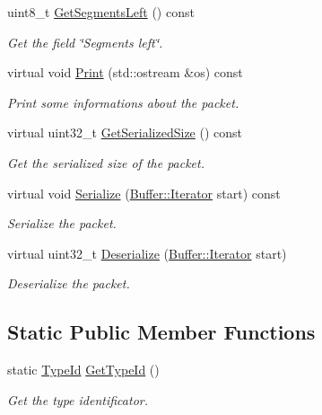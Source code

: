 \begin{DoxyCompactItemize}
uint8\+\_\+t \hyperlink{classns3_1_1Ipv6ExtensionRoutingHeader_a8eb73ece29725d2122833899750763f3}{Get\+Segments\+Left} () const 
\begin{DoxyCompactList}\small\item\em Get the field \char`\"{}\+Segments left\char`\"{}. \end{DoxyCompactList}\item 
virtual void \hyperlink{classns3_1_1Ipv6ExtensionRoutingHeader_a97a4df238f07a4a8104206511d25f7be}{Print} (std\+::ostream \&os) const 
\begin{DoxyCompactList}\small\item\em Print some informations about the packet. \end{DoxyCompactList}\item 
virtual uint32\+\_\+t \hyperlink{classns3_1_1Ipv6ExtensionRoutingHeader_af5b8d368c6a545a95700115686a99e33}{Get\+Serialized\+Size} () const 
\begin{DoxyCompactList}\small\item\em Get the serialized size of the packet. \end{DoxyCompactList}\item 
virtual void \hyperlink{classns3_1_1Ipv6ExtensionRoutingHeader_a33d8ab5f11d270295e3f5a9b4581bd56}{Serialize} (\hyperlink{classns3_1_1Buffer_1_1Iterator}{Buffer\+::\+Iterator} start) const 
\begin{DoxyCompactList}\small\item\em Serialize the packet. \end{DoxyCompactList}\item 
virtual uint32\+\_\+t \hyperlink{classns3_1_1Ipv6ExtensionRoutingHeader_aa1084222d3efdae9d445ff8a5b00322a}{Deserialize} (\hyperlink{classns3_1_1Buffer_1_1Iterator}{Buffer\+::\+Iterator} start)
\begin{DoxyCompactList}\small\item\em Deserialize the packet. \end{DoxyCompactList}\end{DoxyCompactItemize}
\subsection*{Static Public Member Functions}
\begin{DoxyCompactItemize}
\item 
static \hyperlink{classns3_1_1TypeId}{Type\+Id} \hyperlink{classns3_1_1Ipv6ExtensionRoutingHeader_a8104bc8366b0fbe851a3566302caf8dd}{Get\+Type\+Id} ()
\begin{DoxyCompactList}\small\item\em Get the type identificator. \end{DoxyCompactList}\end{DoxyCompactItemize}
